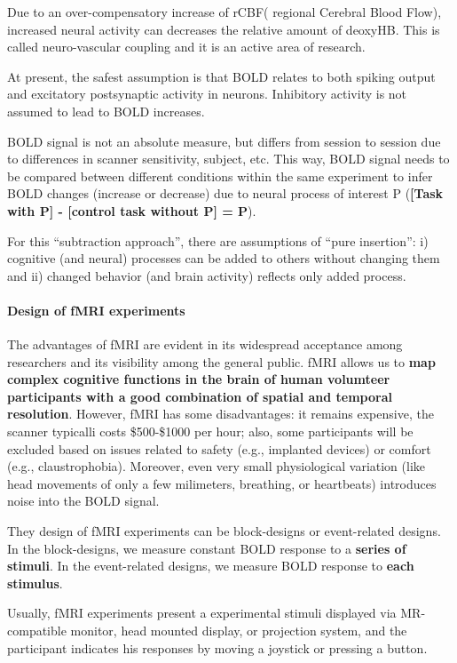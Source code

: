 \documentclass[12pt,article,oneside,a4paper]{memoir}
\begin{document}
Due to an over-compensatory increase of rCBF( regional Cerebral Blood Flow),
increased neural activity can decreases the relative amount of deoxyHB.
This is called neuro-vascular coupling and it is an active area of research.

At present, the safest assumption is that BOLD relates to both spiking output and
excitatory postsynaptic activity in neurons. Inhibitory activity is not assumed
to lead to BOLD increases.

BOLD signal is not an absolute measure, but differs from session to session due to
differences in scanner sensitivity, subject, etc. This way, BOLD signal needs to be
compared between different conditions within the same experiment to infer BOLD changes
(increase or decrease) due to neural process of interest P (\textbf{[Task with P] -
[control task without P] = P}).

For this ``subtraction approach'', there are assumptions of ``pure insertion'':
i) cognitive (and neural) processes can be added to others without changing them and 
ii) changed behavior (and brain activity) reflects only added process.

\paragraph{Design of fMRI experiments}
The advantages of fMRI are evident in its widespread acceptance among researchers
and its visibility among the general public. fMRI allows us to \textbf{map complex
cognitive functions in the brain of human volumteer participants with a good
combination of spatial and temporal resolution}. However, fMRI has some 
disadvantages: it remains expensive, the scanner typicalli costs \$500-\$1000 per hour;
also, some participants will be excluded based on issues related to safety (e.g.,
implanted devices) or comfort (e.g., claustrophobia). Moreover, even very small
physiological variation (like head movements of only a few milimeters, breathing, or
heartbeats) introduces noise into the BOLD signal.

They design of fMRI experiments can be block-designs or event-related designs.
In the block-designs, we measure constant BOLD response to a \textbf{series of stimuli}.
In the event-related designs, we measure BOLD response to \textbf{each stimulus}.

Usually, fMRI experiments present a experimental stimuli displayed via MR-compatible
monitor, head mounted display, or projection system, and the participant indicates his
responses by moving a joystick or pressing a button.
\end{document}
